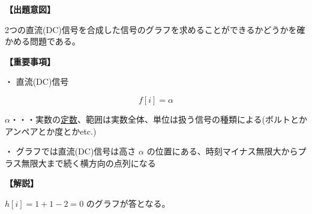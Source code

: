 \noindent \textbf{【出題意図】}

\noindent 2つの直流(DC)信号を合成した信号のグラフを求めることができるかどうかを確かめる問題である。

\vspace{1em}
\noindent \textbf{【重要事項】}

\medskip
\noindent・ 直流(DC)信号

\[
f[i] = \alpha
\]

\bigskip
\noindent $\alpha$・・・実数の\underline{定数}、範囲は実数全体、単位は扱う信号の種類による(ボルトとかアンペアとか度とかetc.)

\bigskip
\noindent・ グラフでは直流(DC)信号は高さ $\alpha$ の位置にある、時刻マイナス無限大からプラス無限大まで続く横方向の点列になる

\vspace{1em}
\noindent \textbf{【解説】}

\noindent $h[i] = 1+1-2 = 0$ のグラフが答となる。
